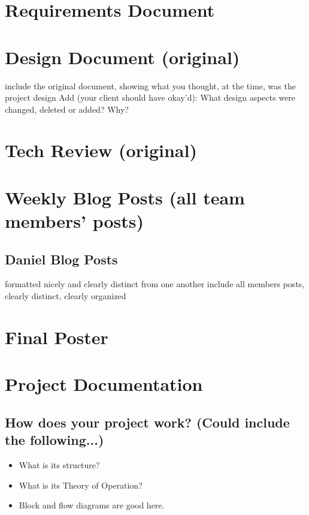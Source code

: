 \documentclass[journal,10pt,onecolumn,compsoc]{IEEEtran}
\begin{document}
    \section{Requirements Document}
    
    
    \section{Design Document (original)}
    
    include the original document, showing what you thought, at the time, was the project design
    Add (your client should have okay'd): What design aspects were changed, deleted or added? Why? 
    \section{Tech Review (original)}
    
    \section{Weekly Blog Posts (all team members' posts)}
    \subsection{Daniel Blog Posts}
    
    formatted nicely and clearly distinct from one another
    include all members posts, clearly distinct, clearly organized
    \section{Final Poster}
    \section{Project Documentation}
    \subsection{How does your project work? (Could include the following...)}
    \begin{itemize}
    \item What is its structure?
    \item What is its Theory of Operation?
    \item Block and flow diagrams are good here.
    \end{itemize}
\end{document}
